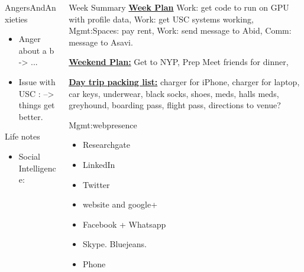 \documentclass[serif, mathserif, final]{beamer}
\begin{document}
\begin{frame}
\begin{columns}
\begin{column}{0.25\linewidth}
\begin{block}{AngersAndAnxieties}
\begin{itemize}
        \item \tiny Anger about a b  -> ...
        \item \tiny Issue with USC : --> things get better. 
        \end{itemize}
      \end{block}
      \begin{block}{Life notes}
        \begin{itemize}
          \tiny \item \tiny Social Intelligence: 
        \end{itemize}
      \end{block}
    \end{column}

\begin{column}{0.5\linewidth}
  \begin{block}{Week Summary}
    {\tiny \underline{\bf Week Plan} Work: get code to run on GPU with
      profile data, Work: get USC systems working, Mgmt:Spaces: pay
      rent, Work: send message to Abid, Comm: message to Asavi.} 
    
    {\tiny \underline{\bf Weekend Plan:}} Get to NYP, Prep Meet
    friends for dinner, 
      
    {\underline{\bf Day trip packing list:} charger for iPhone,
      charger for laptop, car keys, underwear, black socks, shoes, meds, halls
      meds, greyhound, boarding pass, flight pass, directions to
      venue?}

    \begin{block}{Mgmt:webpresence}
      \begin{itemize} 
          \tiny \item \tiny Researchgate 
        \item \tiny LinkedIn 
        \item \tiny Twitter 
        \item \tiny website and google+ 
        \item \tiny Facebook + Whatsapp
        \item \tiny Skype.  Bluejeans. 
        \item \tiny Phone
        \end{itemize}
    \end{block}


\end{block}
\end{column}
\end{columns}
\end{frame}
\end{document}
